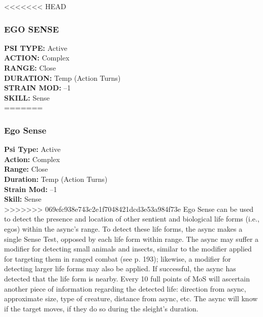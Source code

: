 <<<<<<< HEAD \subsubsection{EGO SENSE} \textbf{PSI TYPE:} Active \\ \textbf{ACTION:} Complex \\ \textbf{RANGE:} Close \\ \textbf{DURATION:} Temp (Action Turns) \\ \textbf{STRAIN MOD:} –1 \\ \textbf{SKILL:} Sense\\ ======= \subsubsection{Ego Sense} \textbf{Psi Type:} Active \\ \textbf{Action:} Complex \\ \textbf{Range:} Close \\ \textbf{Duration:} Temp (Action Turns) \\ \textbf{Strain Mod:} –1 \\ \textbf{Skill:} Sense\\ >>>>>>> 069efc938e743c2e1f7048421dcd3e53a984f73e Ego Sense can be used to detect the presence and location of other sentient and biological life forms (i.e., egos) within the async’s range. To detect these life forms, the async makes a single Sense Test, opposed by each life form within range. The async may suffer a modifier for detecting small animals and insects, similar to the modifier applied for targeting them in ranged combat (see p. 193); likewise, a modifier for detecting larger life forms may also be applied. If successful, the async has detected that the life form is nearby. Every 10 full points of MoS will ascertain another piece of information regarding the detected life: direction from async, approximate size, type of creature, distance from async, etc. The async will know if the target moves, if they do so during the sleight’s duration. 

